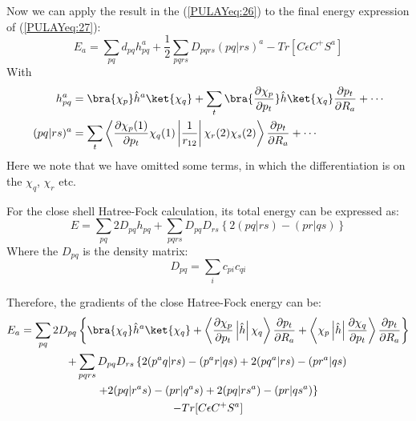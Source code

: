 Now we can apply the result in the (\ref{PULAYeq:26}) to the final
energy expression of (\ref{PULAYeq:27}):
\begin{equation}\label{PULAYeq:28}
  E_{a} = \sum_{pq}d_{pq}h^{a}_{pq} +
  \frac{1}{2}\sum_{pqrs}D_{pqrs}(pq|rs)^{a} -Tr[C\epsilon C^{+}S^{a}]
\end{equation}
With
\begin{align}\label{}
  h^{a}_{pq} &= \bra{\chi_{p}}\hat{h}^{a}\ket{\chi_{q}} + \sum_{t}
  \bra{\frac{\partial \chi_{p}}{\partial
      p_{t}}}\hat{h}\ket{\chi_{q}}\frac{\partial p_{t}}{\partial
    R_{a}} + \cdots
  \nonumber \\
  (pq|rs)^{a} &=\sum_{t} \left\langle\frac{\partial
      \chi_{p}(1)}{\partial
      p_{t}}\chi_{q}(1)\left|\frac{1}{r_{12}}\right|
    \chi_{r}(2)\chi_{s}(2)\right\rangle\frac{\partial p_{t}}{\partial
    R_{a}} + \cdots
\end{align}
Here we note that we have omitted some terms, in which the
differentiation is on the $\chi_{q}$, $\chi_{r}$ etc.


For the close shell Hatree-Fock calculation, its total energy can be
expressed as:
\begin{equation}\label{}
  E = \sum_{pq}2D_{pq}h_{pq} + \sum_{pqrs}D_{pq}D_{rs}\left\{2(pq|rs)
    -(pr|qs)\right\}
\end{equation}
Where the $D_{pq}$ is the density matrix:
\begin{equation}\label{}
  D_{pq} = \sum_{i}c_{pi}c_{qi}
\end{equation}

Therefore, the gradients of the close Hatree-Fock energy can be:
\begin{multline}\label{}
  E_{a} =\sum_{pq}2D_{pq}
  \left\{\bra{\chi_{q}}\hat{h}^{a}\ket{\chi_{q}} +
    \left\langle\frac{\partial \chi_{p}}{\partial
        p_{t}}\left|\hat{h}\right|\chi_{q}\right\rangle\frac{\partial
      p_{t}}{\partial R_{a}} +
    \left\langle\chi_{p}\left|\hat{h}\right|\frac{\partial
        \chi_{q}}{\partial p_{t}}\right\rangle\frac{\partial
      p_{t}}{\partial
      R_{a}}\right\} \\
  +\sum_{pqrs}D_{pq}D_{rs}\left\{2(p^{a}q|rs) -(p^{a}r|qs) +
    2(pq^{a}|rs) -(pr^{a}|qs) \right. \\
  \left.+ 2(pq|r^{a}s) -(pr|q^{a}s) +
    2(pq|rs^{a})-(pr|qs^{a})\right\} \\
  -Tr[C\epsilon C^{+}S^{a}]
\end{multline}

